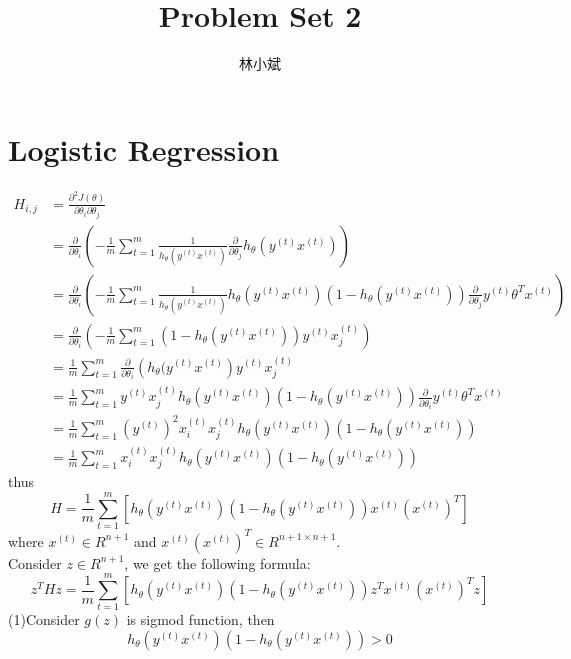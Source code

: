 \documentclass[UTF8]{article}
\author {林小斌}
\title {Problem Set 2}
\begin{document}
\maketitle

\section{Logistic Regression}
\begin{align*}
H_{i,j} &= \frac{\partial^2J(\theta)}{\partial \theta_i \partial \theta_j} \\
&= \frac{\partial}{\partial\theta_i}\left(-\frac{1}{m}\sum_{t=1}^m  \frac{1}{h_\theta(y^{(t)}x^{(t)})} \frac{\partial}{\partial\theta_j }h_\theta(y^{(t)}x^{(t)})\right) \\
&= \frac{\partial}{\partial\theta_i}\left(-\frac{1}{m}\sum_{t=1}^m  \frac{1}{h_\theta(y^{(t)}x^{(t)})}h_\theta(y^{(t)}x^{(t)})(1-h_\theta(y^{(t)}x^{(t)})) \frac{\partial}{\partial\theta_j }y^{(t)}\theta^Tx^{(t)}\right) \\
&= \frac{\partial}{\partial\theta_i}\left(-\frac{1}{m}\sum_{t=1}^m  (1-h_\theta(y^{(t)}x^{(t)}))y^{(t)}x_j^{(t)} \right) \\
&= \frac{1}{m}\sum_{t=1}^m\frac{\partial}{\partial\theta_i}\left(  h_\theta(y^{(t)}x^{(t)} \right)y^{(t)}x_j^{(t)} \\
&= \frac{1}{m}\sum_{t=1}^my^{(t)}x_j^{(t)}h_\theta\left(y^{(t)}x^{(t)}\right)\left(1-h_\theta(y^{(t)}x^{(t)})\right) \frac{\partial}{\partial\theta_i }y^{(t)}\theta^Tx^{(t)} \\
&= \frac{1}{m} \sum_{t=1}^m \left(y^{(t)}\right)^2 x_i^{(t)}x_j^{(t)} h_\theta\left(y^{(t)}x^{(t)}\right)\left(1-h_\theta(y^{(t)}x^{(t)})\right) \\
&= \frac{1}{m} \sum_{t=1}^m x_i^{(t)}x_j^{(t)} h_\theta\left(y^{(t)}x^{(t)}\right)\left(1-h_\theta(y^{(t)}x^{(t)})\right)
\end{align*}
thus
$$
H = \frac{1}{m}\sum_{t=1}^m\left[
h_\theta\left(y^{(t)}x^{(t)}\right)\left(1-h_\theta \left(y^{(t)}x^{(t)}\right)\right)x^{(t)}\left(x^{(t)}\right)^T
\right]
$$
where $x^{(t)} \in R^{n+1}$ and $x^{(t)}\left(x^{(t)}\right)^T \in R^{n+1 \times n+1}$.\\
Consider $z \in R^{n+1}$, we get the following formula:
$$
z^THz = \frac{1}{m}\sum_{t=1}^m\left[
h_\theta\left(y^{(t)}x^{(t)}\right)\left(1-h_\theta \left(y^{(t)}x^{(t)}\right)\right)z^Tx^{(t)}\left(x^{(t)}\right)^Tz
\right]
$$
(1)Consider $g(z)$ is sigmod function, then
$$h_\theta\left(y^{(t)}x^{(t)}\right)\left(1-h_\theta \left(y^{(t)}x^{(t)}\right)\right) > 0 $$
\end{document}
